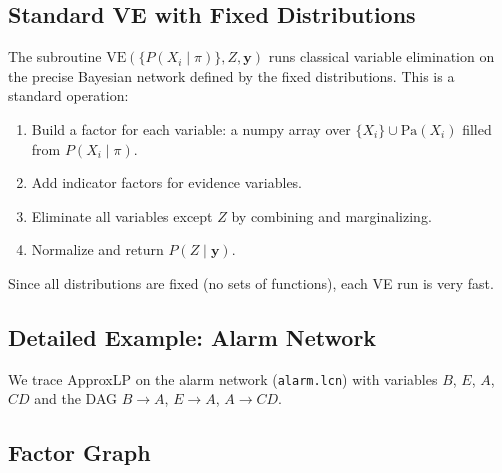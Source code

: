 \documentclass{article}
\begin{document}
\subsection{Standard VE with Fixed Distributions}

The subroutine $\mathrm{VE}(\{P(X_i \mid \pi)\}, Z, \mathbf{y})$ runs classical variable
elimination on the precise Bayesian network defined by the fixed distributions. This is
a standard operation:
\begin{enumerate}
  \item Build a factor for each variable: a numpy array over $\{X_i\} \cup \mathrm{Pa}(X_i)$
        filled from $P(X_i \mid \pi)$.
  \item Add indicator factors for evidence variables.
  \item Eliminate all variables except $Z$ by combining and marginalizing.
  \item Normalize and return $P(Z \mid \mathbf{y})$.
\end{enumerate}
Since all distributions are fixed (no sets of functions), each VE run is very fast.

\subsection{Detailed Example: Alarm Network}

We trace ApproxLP on the alarm network (\texttt{alarm.lcn}) with variables $B$, $E$, $A$,
$CD$ and the DAG $B \to A$, $E \to A$, $A \to CD$.

\subsection{Factor Graph}

\begin{center}
\end{center}
\end{document}
